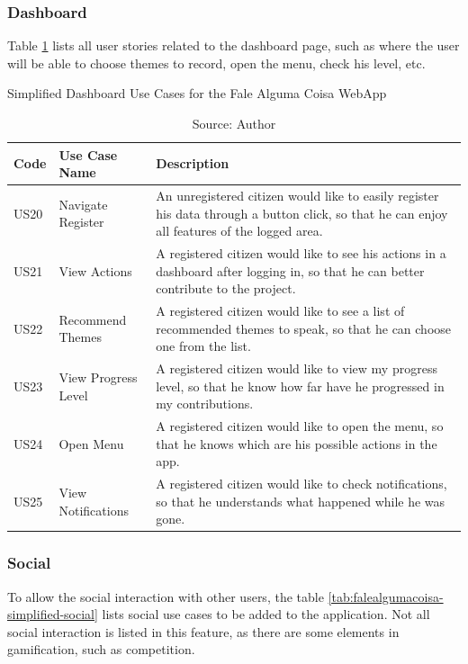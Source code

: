 \clearpage
\subsubsection{Dashboard}

Table \ref{tab:falealgumacoisa-simplified-dashboard} lists all user stories related to the dashboard page, such as where the user will be able to choose themes to record, open the menu, check his level, etc.

\begin{table}[h]
\caption{Simplified Dashboard Use Cases for the Fale Alguma Coisa WebApp}
\label{tab:falealgumacoisa-simplified-dashboard}
\centering
\begin{tabular}{|p{1cm}|p{3cm}|p{10cm}|}
\hline
    Code & Use Case Name & Description \\ \hline
    US20 & Navigate Register & An unregistered citizen would like to easily register his data through a button click, so that he can enjoy all features of the logged area. \\ \hline
    US21 & View Actions & A registered citizen would like to see his actions in a dashboard after logging in, so that he can better contribute to the project. \\ \hline
    US22 & Recommend Themes & A registered citizen would like to see a list of recommended themes to speak, so that he can choose one from the list. \\ \hline
    US23 & View Progress Level & A registered citizen would like to view my progress level, so that he know how far have he  progressed in my contributions. \\ \hline
    US24 & Open Menu & A registered citizen would like to open the menu, so that he knows which are his possible actions in the app. \\ \hline
    US25 & View Notifications & A registered citizen would like to check notifications, so that he understands what happened while he was gone. \\ \hline
\end{tabular}
\caption*{Source: Author}
\end{table}

\subsubsection{Social}

To allow the social interaction with other users, the table \ref{tab:falealgumacoisa-simplified-social} lists social use cases to be added to the application. Not all social interaction is listed in this feature, as there are some elements in gamification, such as competition.

